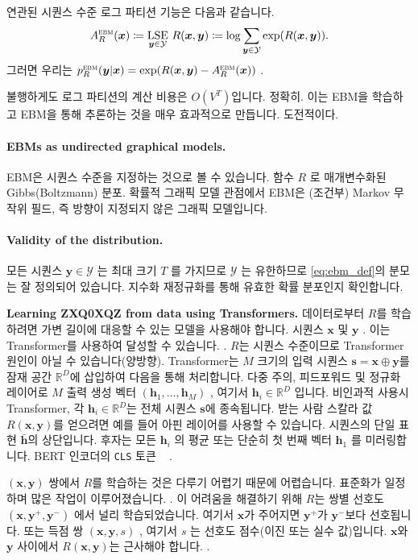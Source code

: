 \documentclass{article}
\def\h{{\bm{h}}}
\def\s{{\bm{s}}}
\def\x{{\bm{x}}}
\def\y{{\bm{y}}}
\def\RR{{\mathbb{R}}}
\def\cY{{\mathcal{Y}}}
\def\ebm{{\textsc{ebm}}}
\def\lse{{\mathrm{LSE}}}
\begin{document}
연관된 시퀀스 수준 로그 파티션 기능은 다음과 같습니다.
 \begin{equation} 
A^ \ebm _R( \x ) 
 \coloneqq \underset{\y \in \cY} { \lse } ~ R( \x , \y )
 \coloneqq \log \sum _{ \y \in \cY } \exp (R( \x , \y )).
 \end{equation} 
그러면 우리는
 $p^\ebm_R(\y|\x) = \exp(R(\x, \y) - A^\ebm_R(\x))$ .

불행하게도 로그 파티션의 계산 비용은 $O(V^T)$입니다.
정확히.  이는 EBM을 학습하고 EBM을 통해 추론하는 것을 매우 효과적으로 만듭니다.
도전적이다.

\paragraph{EBMs as undirected graphical models.}

EBM은 시퀀스 수준을 지정하는 것으로 볼 수 있습니다.
함수 $R$ 로 매개변수화된 Gibbs(Boltzmann) 분포.
확률적 그래픽 모델 관점에서 EBM은 (조건부) 
Markov 무작위 필드, 즉 방향이 지정되지 않은 그래픽 모델입니다.

\paragraph{Validity of the distribution.}

모든 시퀀스 $\y \in \cY$ 는 최대 크기 $T$ 를 가지므로 $\cY$ 는
유한하므로 \eqref{eq:ebm_def}의 분모는 잘 정의되어 있습니다.  지수화
재정규화를 통해 유효한 확률 분포인지 확인합니다.

\textbf{Learning  ZXQ0XQZ  from data using Transformers.} 
데이터로부터 $R$를 학습하려면 가변 길이에 대응할 수 있는 모델을 사용해야 합니다.
시퀀스 $\x$ 및 $\y$ .  이는 Transformer를 사용하여 달성할 수 있습니다.
 \citep{vaswani2017attention} .  $R$는 시퀀스 수준이므로 Transformer
원인이 아닐 수 있습니다(양방향).  Transformer는 $M$ 크기의 입력 시퀀스 $\s =
\x \oplus \y$를 잠재 공간 $\RR^D$에 삽입하여 다음을 통해 처리합니다.
다중 주의, 피드포워드 및 정규화 레이어로 $M$ 출력 생성
벡터 $(\h_1, \ldots, \h_M)$ , 여기서 $\h_i \in \RR^D$ 입니다. 비인과적 사용시
Transformer, 각 $\h_i \in \RR^D$는 전체 시퀀스 $\s$에 종속됩니다. 받는 사람
스칼라 값 $R(\x, \y)$를 얻으려면 예를 들어 아핀 레이어를 사용할 수 있습니다.
시퀀스의 단일 표현 $\bar \h$의 상단입니다. 후자는
모든 $\h_i$ 의 평균 또는 단순히 첫 번째 벡터 $\h_1$ 를 미러링합니다.
 BERT 인코더의 \texttt{CLS} 토큰 ~ \citep{devlin2019bert} .

$(\x, \y)$ 쌍에서 $R$를 학습하는 것은 다루기 어렵기 때문에 어렵습니다.
표준화가 일정하며 많은 작업이 이루어졌습니다.
 \citep{song2021train,sander2025joint} .  이 어려움을 해결하기 위해 $R$는
쌍별 선호도 $(\x, \y^{+}, \y^{-})$ 에서 널리 학습되었습니다. 여기서
 $\x$가 주어지면 $\y^{+}$가 $\y^{-}$보다 선호됩니다. 
 \citep{ziegler2019fine,stiennon2020learning,ouyang2022training} 또는 득점
쌍 $(\x, \y, s)$ , 여기서 $s$ 는 선호도 점수(이진 또는 실수 값)입니다.
$\x$와 $\y$ 사이에서 $R(\x, \y)$는 근사해야 합니다.
 \citep{cobbe2021training} .
\end{document}
